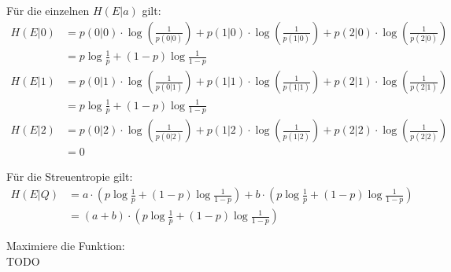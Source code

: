 \begin{myList}
Für die einzelnen $H(E|a)$ gilt:
\begin{align*}
	H(E|0) &= p(0|0) \cdot \log \left(\frac{1}{p(0|0)} \right) + p(1|0) \cdot \log \left(\frac{1}{p(1|0)} \right) + p(2|0) \cdot \log \left(\frac{1}{p(2|0)} \right)\\
	&= p\log \frac{1}{p} + (1-p) \log \frac{1}{1-p}\\
	H(E|1) &= p(0|1) \cdot \log \left(\frac{1}{p(0|1)} \right) + p(1|1) \cdot \log \left(\frac{1}{p(1|1)} \right) + p(2|1) \cdot \log \left(\frac{1}{p(2|1)} \right)\\
	&= p\log \frac{1}{p} + (1-p) \log \frac{1}{1-p}\\
	H(E|2) &= p(0|2) \cdot \log \left(\frac{1}{p(0|2)} \right) + p(1|2) \cdot \log \left(\frac{1}{p(1|2)} \right) + p(2|2) \cdot \log \left(\frac{1}{p(2|2)} \right) \\
	&= 0
\end{align*}

Für die Streuentropie gilt:
\begin{align*}
	H(E|Q) &= a \cdot (p\log \frac{1}{p} + (1-p) \log \frac{1}{1-p}) + b \cdot (p\log \frac{1}{p} + (1-p) \log \frac{1}{1-p}) \\
	&= (a+b) \cdot (p\log \frac{1}{p} + (1-p) \log \frac{1}{1-p})
\end{align*}

Maximiere die Funktion:\\
TODO
\end{myList}

